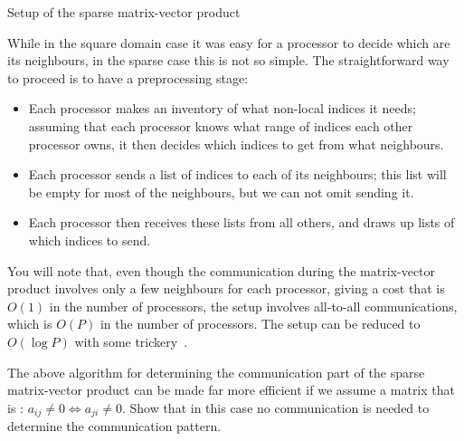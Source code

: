  {Setup of the sparse matrix-vector product}

While in the square
domain case it was easy for a processor to decide which are its
neighbours, in the sparse case this is not so simple. The
straightforward way to proceed is to have a preprocessing stage:
\begin{itemize}
\item Each processor makes an inventory of what non-local indices it
  needs; assuming that each processor knows what range of indices each
  other processor owns, it then decides which indices to get from what
  neighbours.
\item Each processor sends a list of indices to each of its
  neighbours; this list will be empty for most of the neighbours, but
  we can not omit sending it.
\item Each processor then receives these lists from all others, and
  draws up lists of which indices to send.
\end{itemize}
You will note that, even though the communication during the
matrix-vector product involves only a few neighbours for each
processor, giving a cost that is $O(1)$ in the number of processors,
the setup involves all-to-all communications, which is $O(P)$ in the number of
processors.
The setup can be reduced to $O(\log P)$ with some
trickery~\cite{Falgout:scalable-hypre}.

\begin{exercise}
  The above algorithm for determining the communication part of the
  sparse matrix-vector product can be made far more efficient if we
  assume a matrix that is :
  $a_{ij}\not=0\Leftrightarrow a_{ji}\not=0$. Show that in this case
  no communication is needed to determine the communication pattern.
\end{exercise}

